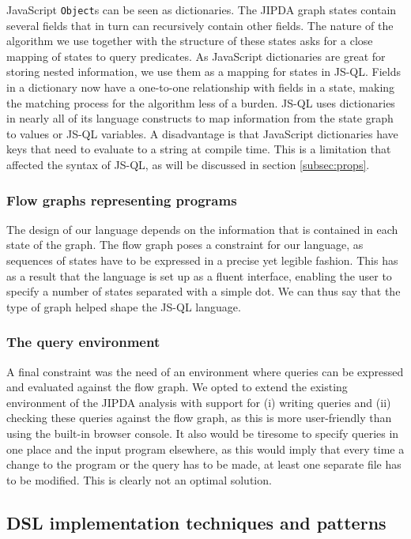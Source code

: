 JavaScript \texttt{Object}s can be seen as dictionaries. The JIPDA graph states contain several fields that in turn can recursively contain other fields. The nature of the algorithm we use together with the structure of these states asks for a close mapping of states to query predicates. As JavaScript dictionaries are great for storing nested information, we use them as a mapping for states in JS-QL. Fields in a dictionary now have a one-to-one relationship with fields in a state, making the matching process for the algorithm less of a burden.
JS-QL uses dictionaries in nearly all of its language constructs to map information from the state graph to values or JS-QL variables. A disadvantage is that JavaScript dictionaries have keys that need to evaluate to a string at compile time. This is a limitation that affected the syntax of JS-QL, as will be discussed in section \ref{subsec:props}.


\subsubsection{Flow graphs representing programs}
 The design of our language depends on the information that is contained in each state of the graph. The flow graph poses a constraint for our language, as sequences of states have to be expressed in a precise yet legible fashion. This has as a result that the language is set up as a fluent interface, enabling the user to specify a number of states separated with a simple dot. We can thus say that the type of graph helped shape the JS-QL language.

\subsubsection{The query environment}

A final constraint was the need of an environment where queries can be expressed and evaluated against the flow graph. We opted to extend the existing environment of the JIPDA analysis with support for (i) writing queries and (ii) checking these queries against the flow graph, as this is more user-friendly than using the built-in browser console. It also would be tiresome to specify queries in one place and the input program elsewhere, as this would imply that every time a change to the program or the query has to be made, at least one separate file has to be modified. This is clearly not an optimal solution.


\subsection{DSL implementation techniques and patterns}

